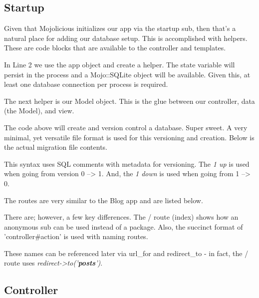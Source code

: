 \documentclass[14pt]{extreport}
\newcommand\Small{\fontsize{12}{13.0}\fontencoding{T1}\selectfont}
\newcommand*\LSTfont{\Small\ttfamily\SetTracking{encoding=*}{-60}\lsstyle}
\begin{document}
\subsection{Startup}

Given that Mojolicious initializes our app via the startup sub, then that's a
natural place for adding our database setup.  This is accomplished with
helpers. These are code blocks that are available to the controller and
templates.



In Line 2 we use the app object and create a helper.  The state variable will
persist in the process and a Mojo::SQLite object will be available.  Given
this, at least one database connection per process is required.

The next helper is our Model object.  This is the glue between our controller,
data (the Model), and view.



The code above will create and version control a database.  Super sweet.  A
very minimal, yet versatile file format is used for this versioning and
creation.  Below is the actual migration file contents.



This syntax uses SQL comments with metadata for versioning.  The  \textit{1 up}
is used when going from version 0 --> 1.  And, the \textit{1 down} is used when
going from 1 --> 0.

The routes are very similar to the Blog app and are listed below.



There are; however, a few key differences.  The / route (index) shows how an
anonymous sub can be used instead of a package.  Also, the succinct format of
'controller\#action' is used with naming routes.  

These names can be referenced later via url\_for and redirect\_to - in fact,
the / route uses \textit{redirect->to('\textbf{posts}')}.

\subsection{Controller}
\end{document}
